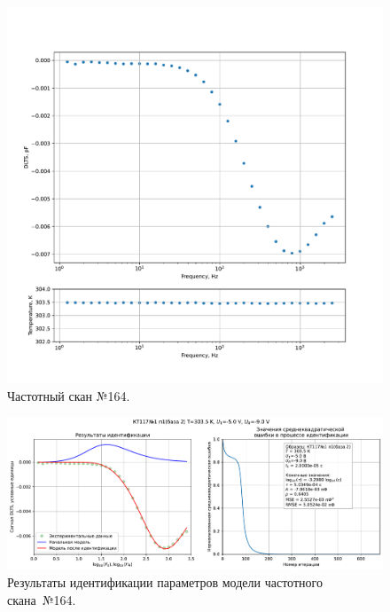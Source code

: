\begin{figure}[!ht]
    \centering
    \includegraphics[width=1\textwidth]{../plots/КТ117№1_п1(база 2)_2500Гц-1Гц_1пФ_+30С_-5В-9В_100мВ_20мкс_шаг_0,1.pdf}
    \caption{Частотный скан №164.}
    \label{pic:frequency_scan_164}
\end{figure}

\begin{figure}[!ht]
    \centering
    \includegraphics[width=1\textwidth]{../plots/КТ117№1_п1(база 2)_2500Гц-1Гц_1пФ_+30С_-5В-9В_100мВ_20мкс_шаг_0,1_model.pdf}
    \caption{Результаты идентификации параметров модели частотного скана~№164.}
    \label{pic:frequency_scan_model164}
\end{figure}

\pagebreak


